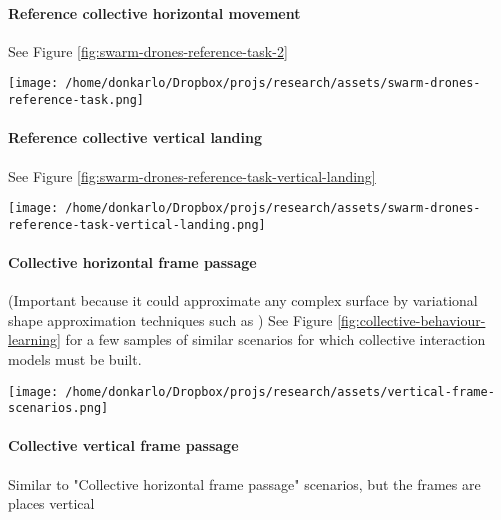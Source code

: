 \documentclass{article}
\begin{document}
				\paragraph{Reference collective horizontal movement}
					See Figure \ref{fig:swarm-drones-reference-task-2}
					\begin{figure*}
						\centering
						\texttt{[image: /home/donkarlo/Dropbox/projs/research/assets/swarm-drones-reference-task.png]}
						\caption{Reference task for which an initial model should be learned}
						\label{fig:swarm-drones-reference-task-2}
					\end{figure*}
				\paragraph{Reference collective vertical landing}
					See Figure \ref{fig:swarm-drones-reference-task-vertical-landing}
					\begin{figure*}
						\centering
						\texttt{[image: /home/donkarlo/Dropbox/projs/research/assets/swarm-drones-reference-task-vertical-landing.png]}
						\caption{Reference task for which an initial model should be learned for vertical landing}
						\label{fig:swarm-drones-reference-task-vertical-landing}
					\end{figure*}
				\paragraph{Collective horizontal frame passage}
					(Important because it could approximate any complex surface by variational shape approximation techniques such as \cite{steiner-2020-lexicographic-optimal-homologous-chains-and-applications-to-point-cloud-triangulations})
					See Figure \ref{fig:collective-behaviour-learning} for a few samples of similar scenarios for which collective interaction models must be built. 
					\begin{figure*}
						\centering
						\texttt{[image: /home/donkarlo/Dropbox/projs/research/assets/vertical-frame-scenarios.png]}
						\caption{Exemplary scenarios from which }
						\label{fig:collective-behaviour-learning}
					\end{figure*}
				\paragraph{Collective vertical frame passage}
					Similar to "Collective horizontal frame passage" scenarios, but the frames are places vertical
\end{document}
